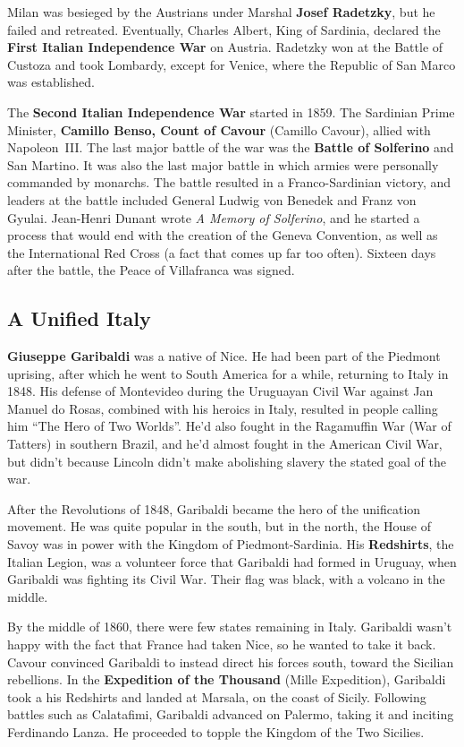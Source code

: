 Milan was besieged by the Austrians under Marshal \textbf{Josef Radetzky}, but he failed and retreated.
Eventually, Charles Albert, King of Sardinia, declared the \textbf{First Italian Independence War} on Austria.
Radetzky won at the Battle of Custoza and took Lombardy,
except for Venice, where the Republic of San Marco was established.

The \textbf{Second Italian Independence War} started in 1859.
The Sardinian Prime Minister, \textbf{Camillo Benso, Count of Cavour} (Camillo Cavour), allied with Napoleon~III\@.
The last major battle of the war was the \textbf{Battle of Solferino} and San Martino.
It was also the last major battle in which armies were personally commanded by monarchs.
The battle resulted in a Franco-Sardinian victory,
and leaders at the battle included General Ludwig von Benedek and Franz von Gyulai.
Jean-Henri Dunant wrote \textit{A Memory of Solferino},
and he started a process that would end with the creation of the Geneva Convention,
as well as the International Red Cross (a fact that comes up far too often).
Sixteen days after the battle, the Peace of Villafranca was signed.

\subsection*{A Unified Italy}

\textbf{Giuseppe Garibaldi} was a native of Nice.
He had been part of the Piedmont uprising, after which he went to South America for a while,
returning to Italy in 1848.
His defense of Montevideo during the Uruguayan Civil War against Jan Manuel do Rosas,
combined with his heroics in Italy,
resulted in people calling him ``The Hero of Two Worlds''.
He'd also fought in the Ragamuffin War (War of Tatters) in southern Brazil,
and he'd almost fought in the American Civil War,
but didn't because Lincoln didn't make abolishing slavery the stated goal of the war.

After the Revolutions of 1848, Garibaldi became the hero of the unification movement.
He was quite popular in the south, but in the north,
the House of Savoy was in power with the Kingdom of Piedmont-Sardinia.
His \textbf{Redshirts}, the Italian Legion, was a volunteer force that Garibaldi had formed in Uruguay,
when Garibaldi was fighting its Civil War.
Their flag was black, with a volcano in the middle.

By the middle of 1860, there were few states remaining in Italy.
Garibaldi wasn't happy with the fact that France had taken Nice, so he wanted to take it back.
Cavour convinced Garibaldi to instead direct his forces south, toward the Sicilian rebellions.
In the \textbf{Expedition of the Thousand} (Mille Expedition),
Garibaldi took a his Redshirts and landed at Marsala, on the coast of Sicily.
Following battles such as Calatafimi, Garibaldi advanced on Palermo, taking it and inciting Ferdinando Lanza.
He proceeded to topple the Kingdom of the Two Sicilies.

